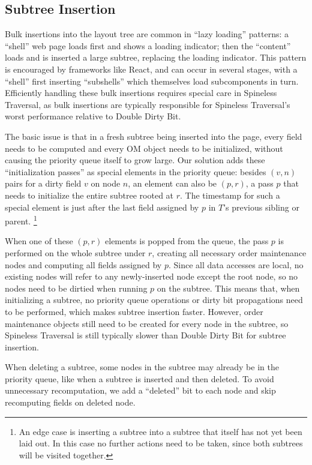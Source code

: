 \subsection{Subtree Insertion}
\label{sec:tree-insertion}

Bulk insertions into the layout tree
  are common in ``lazy loading'' patterns:
  a ``shell'' web page loads first and shows a loading indicator;
  then the ``content'' loads and is inserted a large subtree,
  replacing the loading indicator.
This pattern is encouraged by frameworks like React,
  and can occur in several stages, with a ``shell''
  first inserting ``subshells'' which
  themselves load subcomponents in turn.
Efficiently handling these bulk insertions
  requires special care in Spineless Traversal,
  as bulk insertions are typically responsible
  for Spineless Traversal's worst performance
  relative to Double Dirty Bit.

The basic issue is that in a fresh subtree being inserted into the page,
  every field needs to be computed
  and every OM object needs to be initialized,
  without causing the priority queue itself to grow large.
Our solution adds these ``initialization passes''
  as special elements in the priority queue:
  besides $(v, n)$ pairs for a dirty field $v$ on node $n$,
  an element can also be $(p, r)$,
  a pass $p$ that needs to initialize the entire subtree rooted at $r$.
The timestamp for such a special element
  is just after the last field assigned by $p$
  in $T$'s previous sibling or parent.%
\footnote{
  An edge case is inserting a subtree into
    a subtree that itself has not yet been laid out.
  In this case no further actions need to be taken,
    since both subtrees will be visited together.}

When one of these $(p, r)$ elements is popped from the queue,
  the pass $p$ is performed on the whole subtree under $r$,
  creating all necessary order maintenance nodes
  and computing all fields assigned by $p$.
Since all data accesses are local,
  no existing nodes will refer to any newly-inserted node
  except the root node,
  so no nodes need to be dirtied when running $p$ on the subtree.
This means that, when initializing a subtree,
  no priority queue operations or dirty bit propagations
  need to be performed,
  which makes subtree insertion faster.
However, order maintenance objects still need to be created 
  for every node in the subtree,
  so Spineless Traversal is still
  typically slower than Double Dirty Bit for subtree insertion.

When deleting a subtree,
  some nodes in the subtree may
  already be in the priority queue,
  like when a subtree is inserted and then deleted.
To avoid unnecessary recomputation,
  we add a ``deleted'' bit to each node
  and skip recomputing fields on deleted node.
